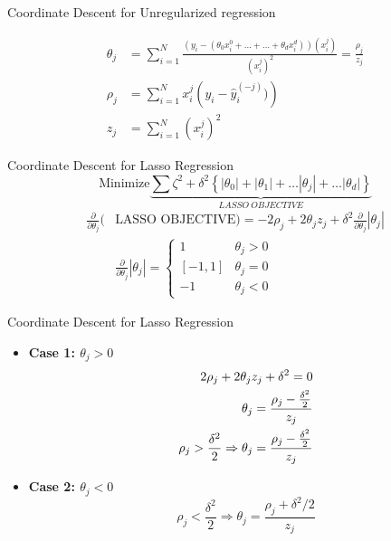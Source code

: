 \documentclass{beamer}
\begin{document}
\begin{frame}{Coordinate Descent for Unregularized regression}

\begin{align*}
    \theta_{j}&=\sum_{i=1}^{N} \frac{\left(y_{i}-\left(\theta_{0} x_{i}^{0}+\ldots + \ldots + \theta_{d}
    x_{i}^{d}\right)\right)\left(x_{i}^{j}\right)}{\left(x_{i}^{j}\right)^{2}}= \frac{\rho_{j}}{z_{j}}\\
    \rho_{j} &=\sum_{i=1}^{N} x_{i}^{j}\left(y_{i}-{\hat{y}_{i}^{(-j)}})\right)\\
    z_{j}&=\sum_{i=1}^{N}\left(x_{i}^{j}\right)^{2}
\end{align*}
\end{frame}





\begin{frame}{Coordinate Descent for Lasso Regression}
\[
  \text{Minimize} \underbrace{\sum \zeta^{2} + \delta^{2}\left\{\left|\theta_{0}\right|+\left|\theta_{1}\right|+\ldots\left|\theta_{j}\right|+\ldots |\theta_{d}|\right\}}_{LASSO \: OBJECTIVE}
\]
\begin{align*}
\frac{\partial}{\partial \theta_{j}}(& \text {LASSO OBJECTIVE})=-2 \rho_{j}+2 \theta_{j} z_{j}+\delta^{2}{\frac{\partial}{\partial \theta_{j}}}\left|\theta_{j}\right|\\[18pt]
&\frac{\partial}{\partial \theta_{j}}\left|\theta_{j}\right|=\left\{\begin{array}{cc}
{1} & {\theta_{j}>0} \\
{[-1,1]} & {\theta_{j}=0} \\
{-1} & {\theta_{j}<0}
\end{array}\right.
\end{align*}
\end{frame}

\begin{frame}{Coordinate Descent for Lasso Regression}
\begin{itemize}
    \item \textbf{Case 1: $\theta_{j}>0$}
    \begin{align*}
    \-2\rho_j+2\theta_j z_j+\delta^{2}  = 0\\
    \theta_j = \frac{\rho_j - \frac{\delta^{2}}{2}}{z_{j}}\\
    \rho_{j}>\frac{\delta^{2}}{2} \Rightarrow  \theta_{j} = \frac{\rho_j - \frac{\delta^{2}}{2}}{z_{j}}
    \end{align*}
    
   \item \textbf{Case 2: $\theta_{j}<0$}
    \begin{equation}
        \rho_{j} < \frac{\delta^{2}}{2} \Rightarrow \theta_{j} = \frac{\rho_{j}+\delta^{2} / 2}{z_{j}}
    \end{equation}
\end{itemize}
    
\end{frame}
\end{document}
